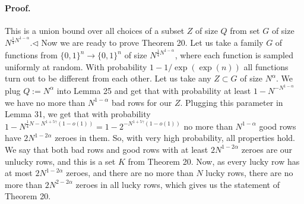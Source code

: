 \documentclass[10pt,a4paper]{article}
\begin{document}
\paragraph{Proof.} This is a union bound over all choices of a subset $Z$ of size $Q$ from set $G$ of size $N^{\frac14N^{1-\alpha}}$.\hfill$\triangleleft$
Now we are ready to prove Theorem 20.
Let us take a family $G$ of functions from $\{0,1\}^n\to\{0,1\}^n$ of size $N^{\frac14N^{1-\alpha}}$, where each function is sampled uniformly at random. With probability $1-1/\exp(\exp(n))$ all functions turn out to be different from each other.
Let us take any $Z\subset G$ of size $N^\alpha$. We plug $Q:=N^\alpha$ into Lemma 25 and get that with probability at least $1-N^{-N^{1-\alpha}}$ we have no more than $N^{1-\alpha}$ bad rows for our $Z$.
Plugging this parameter in Lemma 31, we get that with probability $1-N^{\frac14N-N^{1+5\gamma}(1-o(1))}=1-2^{-N^{1+5\gamma}(1-o(1))}$ no more than $N^{1-\alpha}$ good rows have $2N^{1-2\alpha}$ zeroes in them.
So, with very high probability, all properties hold. We say that both bad rows and good rows with at least $2N^{1-2\alpha}$ zeroes are our unlucky rows, and this is a set $K$ from Theorem 20.
Now, as every lucky row has at most $2N^{1-2\alpha}$ zeroes, and there are no more than $N$ lucky rows, there are no more than $2N^{2-2\alpha}$ zeroes in all lucky rows, which gives us the statement of Theorem 20.
\end{document}
